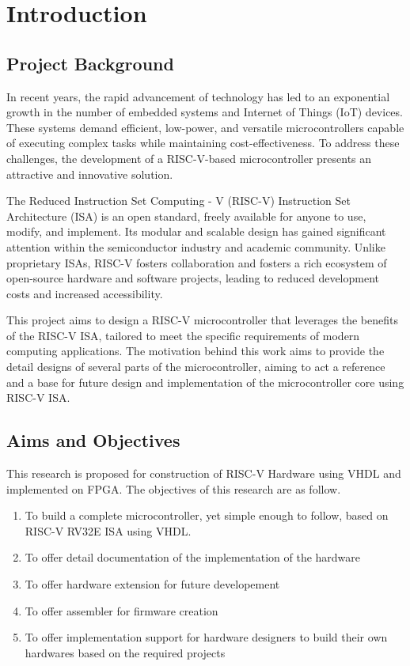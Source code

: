 \chapter{Introduction}
\section{Project Background}

In recent years, the rapid advancement of technology has led to an exponential growth in the number of embedded systems and Internet of Things (IoT) devices. 
These systems demand efficient, low-power, and versatile microcontrollers capable of executing complex tasks while maintaining cost-effectiveness. 
To address these challenges, the development of a RISC-V-based microcontroller presents an attractive and innovative solution.


The Reduced Instruction Set Computing - V (RISC-V) Instruction Set Architecture (ISA) is an open standard, freely available for anyone to use, modify, and implement. 
Its modular and scalable design has gained significant attention within the semiconductor industry and academic community. 
Unlike proprietary ISAs, RISC-V fosters collaboration and fosters a rich ecosystem of open-source hardware and software projects, 
leading to reduced development costs and increased accessibility.


This project aims to design a RISC-V microcontroller that leverages the benefits of the RISC-V ISA, 
tailored to meet the specific requirements of modern computing applications. The motivation behind this work aims to provide the detail designs of several parts of 
the microcontroller, aiming to act a reference and a base for future design and implementation of the microcontroller core using RISC-V ISA.


\section{Aims and Objectives}
This research is proposed for construction of RISC-V Hardware using VHDL and implemented on FPGA.
The objectives of this research are as follow.
\begin{enumerate}
	\item To build a complete microcontroller, yet simple enough to follow, based on RISC-V RV32E ISA using VHDL.
	\item To offer detail documentation of the implementation of the hardware
	\item To offer hardware extension for future developement
	\item To offer assembler for firmware creation
	\item To offer implementation support for hardware designers to build their own hardwares based on the required projects
\end{enumerate}
